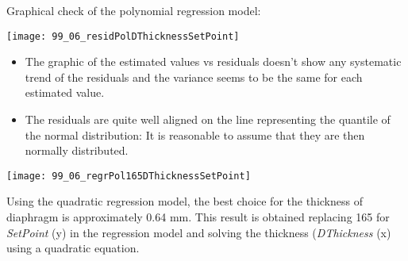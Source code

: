 \begin{frame}
  Graphical check of the polynomial regression model:\\
  \vspace{.1cm}
  \begin{center}
    \texttt{[image: 99\_06\_residPolDThicknessSetPoint]}
    \end{center}
\end{frame}

\begin{frame}
  \vspace{0.75cm}
  \begin{itemize}
    \item The graphic of the estimated values vs residuals doesn't show any systematic trend of the residuals and the variance seems to be the same for each estimated value.
    \vspace{0.5cm}
    \item The residuals are quite well aligned on the line representing the quantile of the normal distribution: It is reasonable to assume that they are then normally distributed.
  \end{itemize}
\end{frame}

\begin{frame}
  \begin{floatingfigure}[l]{7cm}
    \vspace{-1cm}
    \centering
    \texttt{[image: 99\_06\_regrPol165DThicknessSetPoint]}\\
  \end{floatingfigure}
  \begin{footnotesize}
    \vspace{1cm}
    Using the quadratic regression model, the best choice for the thickness of diaphragm is approximately 0.64 mm. This result is obtained replacing 165 for \textit{SetPoint} (y) in the regression model and solving the thickness (\textit{DThickness} (x) using a quadratic equation.
  \end{footnotesize}
\end{frame}


